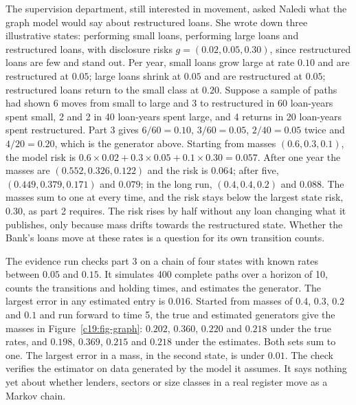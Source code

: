 \begin{example}\label{c19:ex-graph}
The supervision department, still interested in movement, asked Naledi what the graph model would say about restructured loans.
She wrote down three illustrative states: performing small loans, performing large loans and
restructured loans, with disclosure risks $g=(0.02,0.05,0.30)$, since restructured loans are
few and stand out. Per year, small loans grow large at rate $0.10$ and are restructured at $0.05$;
large loans shrink at $0.05$ and are restructured at $0.05$; restructured loans return to the small
class at $0.20$. Suppose a sample of paths had shown 6 moves from small to large and 3 to
restructured in 60 loan-years spent small, 2 and 2 in 40 loan-years spent large, and 4 returns
in 20 loan-years spent restructured. Part 3 gives $6/60=0.10$, $3/60=0.05$, $2/40=0.05$
twice and $4/20=0.20$, which is the generator above. Starting from masses $(0.6,0.3,0.1)$,
the model risk is $0.6\times0.02+0.3\times0.05+0.1\times0.30=0.057$. After one year the masses are
$(0.552,0.326,0.122)$ and the risk is $0.064$; after five, $(0.449,0.379,0.171)$ and $0.079$; in the long
run, $(0.4,0.4,0.2)$ and $0.088$. The masses sum to one at every time, and the risk stays below
the largest state risk, $0.30$, as part 2 requires. The risk rises by half without any loan changing what it publishes, only because mass drifts towards the restructured state. Whether the
Bank's loans move at these rates is a question for its own transition counts.
\end{example}

The evidence run checks part 3 on a chain of four states with known rates between $0.05$
and $0.15$. It simulates 400 complete paths over a horizon of 10, counts the transitions and
holding times, and estimates the generator. The largest error in any estimated entry is $0.016$.
Started from masses of $0.4$, $0.3$, $0.2$ and $0.1$ and run forward to time 5, the true and estimated
generators give the masses in Figure~\ref{c19:fig-graph}: $0.202$, $0.360$, $0.220$ and $0.218$ under the true rates,
and $0.198$, $0.369$, $0.215$ and $0.218$ under the estimates. Both sets sum to one. The largest
error in a mass, in the second state, is under $0.01$. The check verifies the estimator on data
generated by the model it assumes. It says nothing yet about whether lenders, sectors or
size classes in a real register move as a Markov chain.


